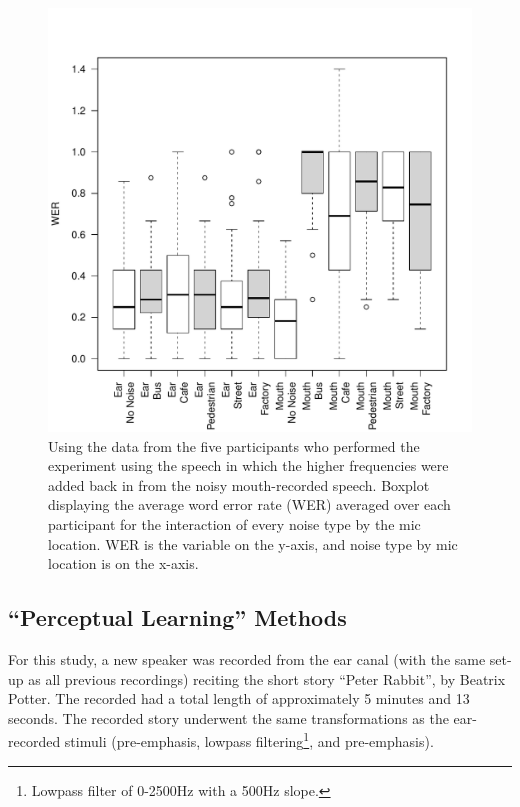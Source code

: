 \documentclass[dissertation,copyright]{uathesis}
\makeatletter
\def\maxwidth{ %
  \ifdim\Gin@nat@width>\linewidth
    \linewidth
  \else
    \Gin@nat@width
  \fi
}
\makeatother
\begin{document}
\begin{figure}

\includegraphics[width=\maxwidth]{figure/F0_boxplot_noiseXmic-1} 

\caption{Using the data from the five participants who performed the experiment using the speech in which the higher frequencies were added back in from the noisy mouth-recorded speech.  Boxplot displaying the average word error rate (WER) averaged over each participant for the interaction of every noise type by the mic location. WER is the variable on the y-axis, and noise type by mic location is on the x-axis.}
\label{fig:F0_noiseXmic_boxplot}
\end{figure}


\subsection{``Perceptual Learning'' Methods}

For this study, a new speaker was recorded from the ear canal (with the same set-up as all previous recordings) reciting the short story ``Peter Rabbit'', by Beatrix Potter.  The recorded had a total length of approximately 5 minutes and 13 seconds.  The recorded story underwent the same transformations as the ear-recorded stimuli (pre-emphasis, lowpass filtering\footnote{Lowpass filter of 0-2500Hz with a 500Hz slope.}, and pre-emphasis).
\end{document}
